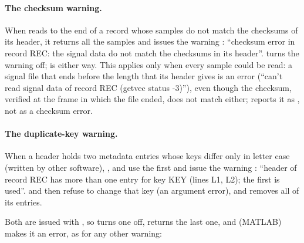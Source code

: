 \paragraph{The checksum warning.} When  reads to the end of a
record whose samples do not match the checksums of its header, it returns all the samples
and issues the warning : ``checksum error in record REC: the signal
data do not match the checksums in its header''.  turns
the warning off;  is  either way. This applies only
when every sample could be read: a signal file that ends before the length that its
header gives is an error (``can't read signal data of record REC (getvec status -3)''),
even though the checksum, verified at the frame in which the file ended, does not match
either;  reports it as , not as a
checksum error.

\paragraph{The duplicate-key warning.} When a header holds two metadata entries whose keys
differ only in letter case (written by other software), ,
 and  use the first and issue the
warning : ``header of record REC has more than one entry for
key KEY (lines L1, L2); the first is used''.  and
 then refuse to change that key (an argument error), and
 removes all of its entries.

Both are issued with , so  turns one
off,  returns the last one, and  (MATLAB) makes
it an error, as for any other warning:


